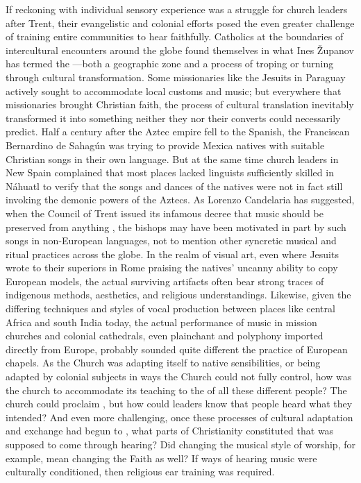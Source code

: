 If reckoning with individual sensory experience was a struggle for church
leaders after Trent, their evangelistic and colonial efforts posed the even
greater challenge of training entire communities to hear faithfully.
Catholics at the boundaries of intercultural encounters around the globe found
themselves in what Ines Županov has termed the ---both a geographic zone and a process of troping or turning through
cultural transformation.%
    \Autocite{Zupanov:MissionaryTropics}
Some missionaries like the Jesuits in Paraguay actively sought to accommodate
local customs and music; but everywhere that missionaries brought Christian
faith, the process of cultural translation inevitably transformed it into
something neither they nor their converts could necessarily predict.%
    \Autocites
    {Bailey:Art}
    {Fromont:DancingKingCongo}
Half a century after the Aztec empire fell to the Spanish, the Franciscan
Bernardino de Sahagún was trying to provide Mexica natives with suitable
Christian songs in their own language.
But at the same time church leaders in New Spain complained that most places
lacked linguists sufficiently skilled in Náhuatl to verify that the songs and
dances of the natives were not in fact still invoking the demonic powers of the
Aztecs.%
    \Autocite[637]{Candelaria:Psalmodia}
As Lorenzo Candelaria has suggested, when the Council of Trent issued its
infamous decree that music should be preserved from anything , the bishops may have been motivated in part by such songs
in non-European languages, not to mention other syncretic musical and ritual
practices across the globe.%
    \Autocite[637--638]{Candelaria:Psalmodia}
In the realm of visual art, even where Jesuits wrote to their superiors in Rome
praising the natives' uncanny ability to copy European models, the actual
surviving artifacts often bear strong traces of indigenous methods, aesthetics,
and religious understandings.%
    \Autocite[27--29, 34]{Bailey:Art}
Likewise, given the differing techniques and styles of vocal production between
places like central Africa and south India today, the actual performance of
music in mission churches and colonial cathedrals, even plainchant and polyphony
imported directly from Europe, probably sounded quite different the practice of
European chapels.
As the Church was adapting itself to native sensibilities, or being adapted by
colonial subjects in ways the Church could not fully control, how was the church
to accommodate its teaching to the  of all these
different people?
The church could proclaim , but how could leaders know that
people heard what they intended?
And even more challenging, once these processes of cultural adaptation and
exchange had begun to , what parts of Christianity constituted
 that was supposed to come through hearing?
Did changing the musical style of worship, for example, mean changing the Faith
as well?
If ways of hearing music were culturally conditioned, then religious ear
training was required.

